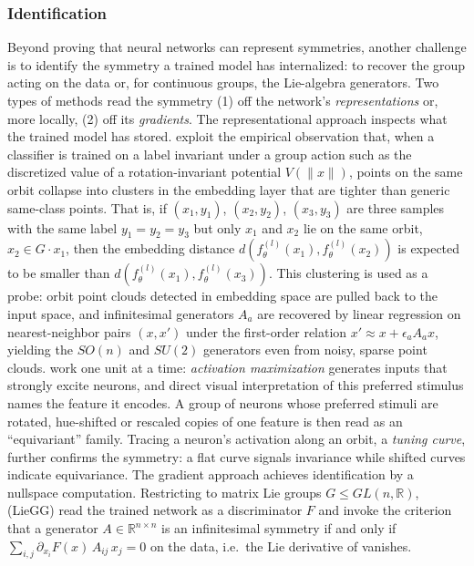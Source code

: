\documentclass[mathematics,review,submit,moreauthors]{Definitions/mdpi}
\begin{document}
\subsubsection{Identification}\label{sec:disco-identification}
Beyond proving that neural networks can represent symmetries, another challenge is to identify the symmetry a trained model has internalized: to recover the group acting on the data or, for continuous groups, the Lie-algebra generators.
Two types of methods read the symmetry (1) off the network's \emph{representations} or, more locally, (2) off its \emph{gradients}.\newline
The representational approach inspects what the trained model has stored.
\citet{krippendorf2020} exploit the empirical observation that, when a classifier is trained on a label invariant under a group action such as the discretized value of a rotation-invariant potential $V(\|x\|)$, points on the same orbit collapse into clusters in the embedding layer that are tighter than generic same-class points.
That is, if $(x_1, y_1)$, $(x_2, y_2)$, $(x_3, y_3)$ are three samples with the same label $y_1 = y_2 = y_3$ but only $x_1$ and $x_2$ lie on the same orbit, $x_2\in G\cdot x_1$, then the embedding distance $d(f_\theta^{(l)}(x_1), f_\theta^{(l)}(x_2))$ is expected to be smaller than $d(f_\theta^{(l)}(x_1), f_\theta^{(l)}(x_3))$.
This clustering is used as a probe: orbit point clouds detected in embedding space are pulled back to the input space, and infinitesimal generators $A_a$ are recovered by linear regression on nearest-neighbor pairs $(x,x')$ under the first-order relation $x' \approx x + \epsilon_a A_a x$, yielding the $SO(n)$ and $SU(2)$ generators even from noisy, sparse point clouds.
\citet{olah2020d} work one unit at a time: \emph{activation maximization} generates inputs that strongly excite neurons, and direct visual interpretation of this preferred stimulus names the feature it encodes.
A group of neurons whose preferred stimuli are rotated, hue-shifted or rescaled copies of one feature is then read as an ``equivariant'' family.
Tracing a neuron's activation along an orbit, a \emph{tuning curve}, further confirms the symmetry: a flat curve signals invariance while shifted curves indicate equivariance.\newline
The gradient approach achieves identification by a nullspace computation.
Restricting to matrix Lie groups $G \leq GL(n,\mathbb{R})$, \citet{moskalev2023} (LieGG) read the trained network as a discriminator $F$ and invoke the criterion that a generator $A\in\mathbb{R}^{n\times n}$ is an infinitesimal symmetry if and only if $\sum_{i,j} \partial_{x_i} F(x)\,A_{ij}\, x_j = 0$ on the data, i.e.\ the Lie derivative of  vanishes.
\end{document}
